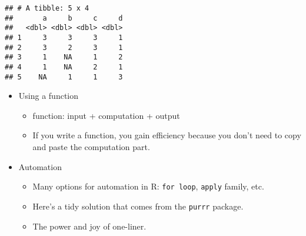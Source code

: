 \documentclass[
]{book}
\newenvironment{Shaded}{\begin{snugshade}}{\end{snugshade}}
\newcommand{\CommentTok}[1]{\textcolor[rgb]{0.56,0.35,0.01}{\textit{#1}}}
\newcommand{\ConstantTok}[1]{\textcolor[rgb]{0.00,0.00,0.00}{#1}}
\newcommand{\ControlFlowTok}[1]{\textcolor[rgb]{0.13,0.29,0.53}{\textbf{#1}}}
\newcommand{\DecValTok}[1]{\textcolor[rgb]{0.00,0.00,0.81}{#1}}
\newcommand{\FunctionTok}[1]{\textcolor[rgb]{0.00,0.00,0.00}{#1}}
\newcommand{\NormalTok}[1]{#1}
\newcommand{\OtherTok}[1]{\textcolor[rgb]{0.56,0.35,0.01}{#1}}
\newcommand{\SpecialCharTok}[1]{\textcolor[rgb]{0.00,0.00,0.00}{#1}}
\providecommand{\tightlist}{%
  \setlength{\itemsep}{0pt}\setlength{\parskip}{0pt}}
\begin{document}
\begin{verbatim}
## # A tibble: 5 x 4
##       a     b     c     d
##   <dbl> <dbl> <dbl> <dbl>
## 1     3     3     3     1
## 2     3     2     3     1
## 3     1    NA     1     2
## 4     1    NA     2     1
## 5    NA     1     1     3
\end{verbatim}

\begin{itemize}
\tightlist
\item
  Using a function

  \begin{itemize}
  \tightlist
  \item
    function: input + computation + output
  \item
    If you write a function, you gain efficiency because you don't need to copy and paste the computation part.
  \end{itemize}
\end{itemize}

\begin{Shaded}
\end{Shaded}

\begin{itemize}
\tightlist
\item
  Automation

  \begin{itemize}
  \tightlist
  \item
    Many options for automation in R: \texttt{for\ loop}, \texttt{apply} family, etc.
  \item
    Here's a tidy solution that comes from the \texttt{purrr} package.
  \item
    The power and joy of one-liner.
  \end{itemize}
\end{itemize}
\end{document}
